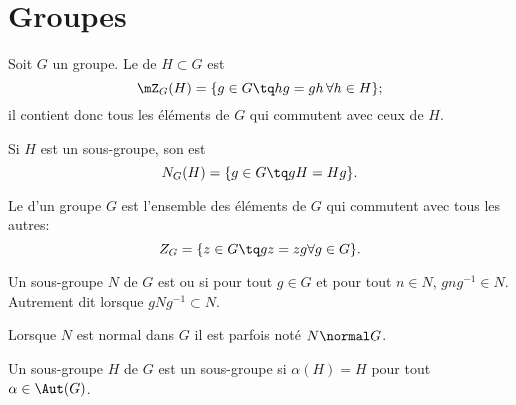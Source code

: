 
\section{Groupes}

\begin{definition}
    Soit \( G\) un groupe. Le  de \( H\subset G\) est 
    \begin{equation}
        \mZ_G(H)=\{ g\in G\tq hg=gh\,\forall h\in H\};
    \end{equation}
    il contient donc tous les éléments de \( G\) qui commutent avec ceux de \( H\).
    
    Si \( H\) est un sous-groupe, son  est
    \begin{equation}
        N_G(H)=\{ g\in G\tq gH=Hg \}.
    \end{equation}
\end{definition}

\begin{definition}
Le  d'un groupe \( G\) est l'ensemble des éléments de \( G\) qui commutent avec tous les autres:
\begin{equation}
    Z_G=\{ z\in G\tq gz=zg\forall g\in G \}.
\end{equation}
\end{definition}

\begin{definition}
    Un sous-groupe \( N\) de \( G\) est  ou  si pour tout \( g\in G\) et pour tout \( n\in N\), \( gng^{-1}\in N\). Autrement dit lorsque \( gNg^{-1}\subset N\). 

    Lorsque \( N\) est normal dans \( G\) il est parfois noté \( N\normal G\).

    Un sous-groupe \( H\) de \( G\) est un sous-groupe  si \( \alpha(H)=H\) pour tout \( \alpha\in \Aut(G)\).
\end{definition}


